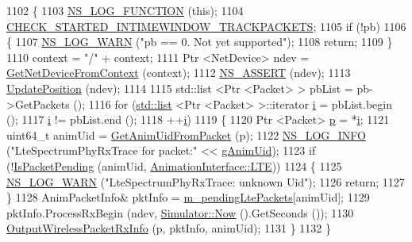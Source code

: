 \begin{DoxyCode}
1102 \{
1103   \hyperlink{log-macros-disabled_8h_a90b90d5bad1f39cb1b64923ea94c0761}{NS\_LOG\_FUNCTION} (\textcolor{keyword}{this});
1104   \hyperlink{animation-interface_8h_acdf351a3155a6ccf1813189e10dba8f5}{CHECK\_STARTED\_INTIMEWINDOW\_TRACKPACKETS};
1105   \textcolor{keywordflow}{if} (!pb) 
1106     \{
1107       \hyperlink{group__logging_gade7208b4009cdf0e25783cd26766f559}{NS\_LOG\_WARN} (\textcolor{stringliteral}{"pb == 0. Not yet supported"});
1108       \textcolor{keywordflow}{return};
1109     \}
1110   context = \textcolor{stringliteral}{"/"} + context;
1111   Ptr <NetDevice> ndev = \hyperlink{classns3_1_1AnimationInterface_a5054e94f0c5e3d0a4443cfbe52e2ea30}{GetNetDeviceFromContext} (context);
1112   \hyperlink{assert_8h_a6dccdb0de9b252f60088ce281c49d052}{NS\_ASSERT} (ndev);
1113   \hyperlink{classns3_1_1AnimationInterface_ab751cf6f459289f0978f4bb97b93044d}{UpdatePosition} (ndev);
1114 
1115   std::list <Ptr <Packet> > pbList = pb->GetPackets ();
1116   \textcolor{keywordflow}{for} (\hyperlink{openflow-interface_8h_afd9bcfa176617760671b67580f536fa7}{std::list} <Ptr <Packet> >::iterator \hyperlink{bernuolliDistribution_8m_a6f6ccfcf58b31cb6412107d9d5281426}{i}  = pbList.begin ();
1117        \hyperlink{bernuolliDistribution_8m_a6f6ccfcf58b31cb6412107d9d5281426}{i} != pbList.end ();
1118        ++\hyperlink{bernuolliDistribution_8m_a6f6ccfcf58b31cb6412107d9d5281426}{i})
1119     \{
1120       Ptr <Packet> \hyperlink{lte__link__budget_8m_ac9de518908a968428863f829398a4e62}{p} = *\hyperlink{bernuolliDistribution_8m_a6f6ccfcf58b31cb6412107d9d5281426}{i};
1121       uint64\_t animUid = \hyperlink{classns3_1_1AnimationInterface_a18e6a184ccd7dee800bf734f8adc818c}{GetAnimUidFromPacket} (p);
1122       \hyperlink{group__logging_gafbd73ee2cf9f26b319f49086d8e860fb}{NS\_LOG\_INFO} (\textcolor{stringliteral}{"LteSpectrumPhyRxTrace for packet:"} << \hyperlink{classns3_1_1AnimationInterface_a98ecb4d4c024e52171b3154f09b7bcc2}{gAnimUid});
1123       \textcolor{keywordflow}{if} (!\hyperlink{classns3_1_1AnimationInterface_a0bee27aa30e136d5035050ec2ef0012d}{IsPacketPending} (animUid, \hyperlink{classns3_1_1AnimationInterface_a801a4efd553ff0d1d768cd70d22456b6a8a686aad98ab0f637f9e8ff674672d0a}{AnimationInterface::LTE}))
1124         \{
1125           \hyperlink{group__logging_gade7208b4009cdf0e25783cd26766f559}{NS\_LOG\_WARN} (\textcolor{stringliteral}{"LteSpectrumPhyRxTrace: unknown Uid"});
1126           \textcolor{keywordflow}{return};
1127         \}
1128       AnimPacketInfo& pktInfo = \hyperlink{classns3_1_1AnimationInterface_abc07805734a4f250a8c791730cdffd67}{m\_pendingLtePackets}[animUid];
1129       pktInfo.ProcessRxBegin (ndev, \hyperlink{classns3_1_1Simulator_ac3178fa975b419f7875e7105be122800}{Simulator::Now} ().GetSeconds ());
1130       \hyperlink{classns3_1_1AnimationInterface_ae7dbb6c566787d3444e3fcba367e5338}{OutputWirelessPacketRxInfo} (p, pktInfo, animUid);
1131     \}
1132 \}
\end{DoxyCode}



